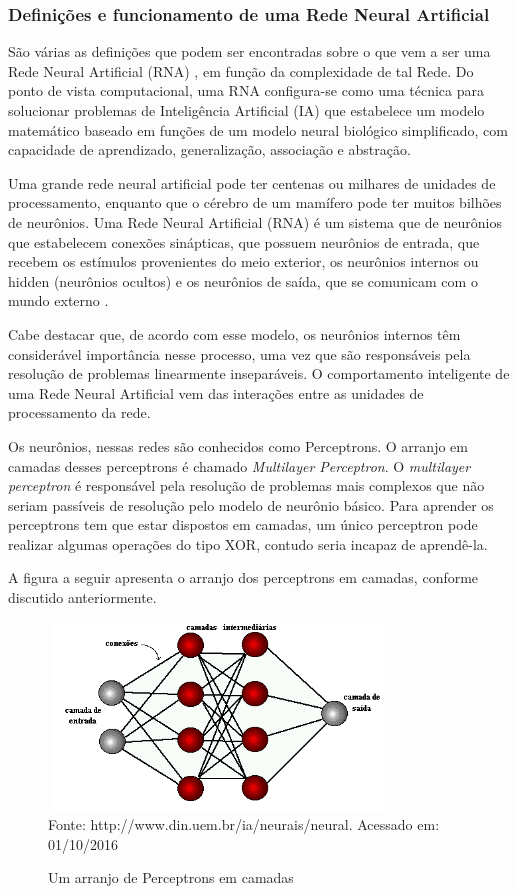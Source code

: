 \subsubsection{Definições e funcionamento de uma Rede Neural Artificial}

São várias as definições que podem ser encontradas sobre o que vem a ser uma Rede Neural Artificial (RNA) \cite{Castanheira2008}, em função da complexidade de tal Rede. 
Do ponto de vista computacional, uma RNA configura-se como uma técnica para solucionar problemas de Inteligência Artificial (IA) que estabelece um modelo matemático 
baseado em funções de um modelo neural biológico simplificado, com capacidade de aprendizado, generalização, associação e abstração.

Uma grande rede neural artificial pode ter centenas ou milhares de unidades de processamento, enquanto que o cérebro de um mamífero pode ter muitos bilhões de neurônios. 
Uma Rede Neural Artificial (RNA) é um sistema que de neurônios que estabelecem conexões sinápticas, que possuem neurônios de entrada, que recebem os estímulos provenientes 
do meio exterior, os neurônios internos ou hidden (neurônios ocultos) e os neurônios de saída, que se comunicam com o mundo externo \cite{Tatibana}.

Cabe destacar que, de acordo com esse modelo, os neurônios internos têm considerável importância nesse processo, uma vez que são responsáveis pela resolução de problemas linearmente inseparáveis. 
O comportamento inteligente de uma Rede Neural Artificial vem das interações entre as unidades de processamento da rede.

Os neurônios, nessas redes são conhecidos como Perceptrons. O arranjo em camadas desses perceptrons é chamado \textit{Multilayer Perceptron}.
O \textit{multilayer perceptron} é responsável pela resolução de problemas mais complexos que não seriam passíveis de resolução pelo modelo 
de neurônio básico. Para aprender os perceptrons tem que estar dispostos em camadas, um único perceptron pode realizar algumas operações do 
tipo XOR, contudo seria incapaz de aprendê-la.

A figura a seguir apresenta o arranjo dos perceptrons em camadas, conforme discutido anteriormente.
\pagebreak

\begin{figure}[!ht]
\centering
\caption{Um arranjo de Perceptrons em camadas}
\vspace{1mm}
\includegraphics[width=90mm, height=50mm]{Figuras/Neural/camdasIntermediarias.png}\\
\tiny Fonte: http://www.din.uem.br/ia/neurais/neural. Acessado em: 01/10/2016
\end{figure}

